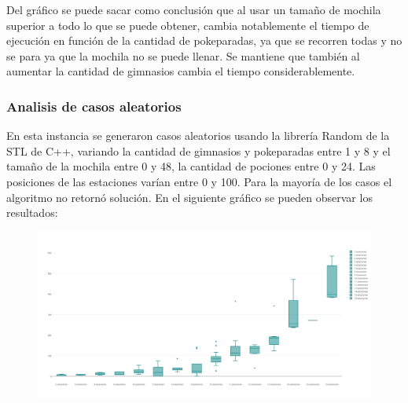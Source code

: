      Del gráfico se puede sacar como conclusión que al usar un tamaño de mochila superior a todo lo que se puede obtener, cambia notablemente el tiempo de ejecución en función de la cantidad de pokeparadas, ya que se recorren todas y no se para ya que la mochila no se puede llenar. Se mantiene que también al aumentar la cantidad de gimnasios cambia el tiempo considerablemente.

      \subsubsection{Analisis de casos aleatorios}
      En esta instancia se generaron casos aleatorios usando la librería Random de la STL de C++, variando la cantidad de gimnasios y pokeparadas entre 1 y 8 y el tamaño de la mochila entre 0 y 48, la cantidad de pociones entre 0 y 24. Las posiciones de las estaciones varían entre 0 y 100. Para la mayoría de los casos el algoritmo no retornó solución.
      En el siguiente gráfico se pueden observar los resultados:

      \begin{figure}[H]
      \begin{center}
        \includegraphics[width=1.0\columnwidth]{imagenes/exp_random_ej2.jpeg}
        \caption{}
      \end{center}
  \end{figure}

